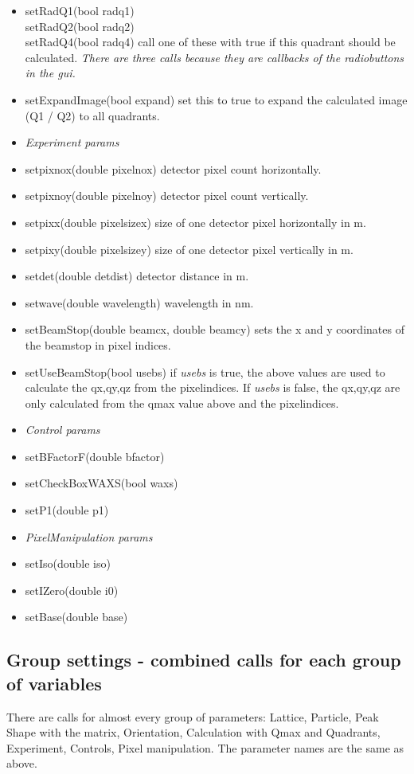 \documentclass[11pt]{article} %
\begin{document}
\begin{itemize}
\item setRadQ1(bool radq1) \\
	setRadQ2(bool radq2) \\
	setRadQ4(bool radq4) call one of these with true if this quadrant should be calculated. {\it There are three calls because they are callbacks of the radiobuttons in the gui.}
\item setExpandImage(bool expand) set this to true to expand the calculated image (Q1 / Q2) to all quadrants.
% 
\item[] {\it Experiment params}
\item setpixnox(double pixelnox) detector pixel count horizontally.
\item setpixnoy(double pixelnoy) detector pixel count vertically.
\item setpixx(double pixelsizex) size of one detector pixel horizontally in m.
\item setpixy(double pixelsizey) size of one detector pixel vertically in m.
\item setdet(double detdist) detector distance in m.
\item setwave(double wavelength) wavelength in nm.
\item setBeamStop(double beamcx, double beamcy) sets the x and y coordinates of the beamstop in pixel indices.
\item setUseBeamStop(bool usebs) if {\it usebs} is true, the above values are used to calculate the qx,qy,qz from the pixelindices. If {\it usebs} is false, the qx,qy,qz are only calculated from the qmax value above and the pixelindices.
% 
\item[] {\it Control params}
\item setBFactorF(double bfactor)
\item setCheckBoxWAXS(bool waxs)
\item setP1(double p1)
% 
\item[] {\it PixelManipulation params}
\item setIso(double iso)
\item setIZero(double i0)
\item setBase(double base)
\end{itemize}


\subsection{Group settings - combined calls for each group of variables}

There are calls for almost every group of parameters: Lattice, Particle, Peak Shape with the matrix, Orientation, Calculation with Qmax and Quadrants, Experiment, Controls, Pixel manipulation. The parameter names are the same as above.
\end{document}
